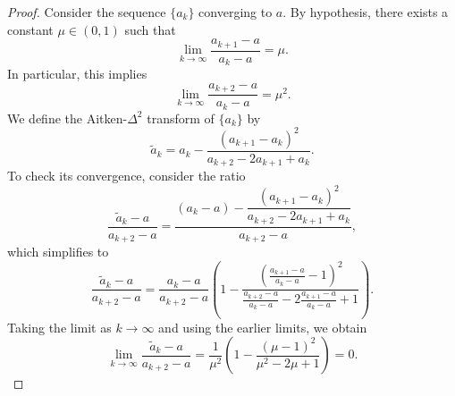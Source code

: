 \documentclass[10pt,a4paper]{amsart}
\begin{document}
\begin{proof}
	Consider the sequence \(\{a_k\}\) converging to \(a\). By hypothesis, there exists a constant \(\mu \in (0,1)\) such that
	\[
	\lim_{k \to \infty} \frac{a_{k+1} - a}{a_k - a} = \mu.
	\]
	In particular, this implies
	\[
	\lim_{k \to \infty} \frac{a_{k+2} - a}{a_k - a} = \mu^2.
	\]
	We define the Aitken-\(\Delta^2\) transform of \(\{a_k\}\) by
	\[
	\tilde{a}_k = a_k - \frac{(a_{k+1} - a_k)^2}{a_{k+2} - 2a_{k+1} + a_k}.
	\]
	To check its convergence, consider the ratio
	\[
	\frac{\tilde{a}_k - a}{a_{k+2} - a}
	= \frac{(a_k - a) - \dfrac{(a_{k+1} - a_k)^2}{a_{k+2} - 2a_{k+1} + a_k}}{a_{k+2} - a},
	\]
	which simplifies to
	\begin{equation}\label{eq:aitken_ratio}
		\frac{\tilde{a}_k - a}{a_{k+2} - a}
		= \frac{a_k - a}{a_{k+2} - a}
		\left(
		1 - \frac{\left( \tfrac{a_{k+1} - a}{a_k - a} - 1 \right)^2}{
			\tfrac{a_{k+2} - a}{a_k - a} - 2\tfrac{a_{k+1} - a}{a_k - a} + 1}
		\right).
	\end{equation}
	Taking the limit as \(k \to \infty\) and using the earlier limits, we obtain
	\[
	\lim_{k \to \infty} \frac{\tilde{a}_{k} - a}{a_{k+2} - a}
	= \frac{1}{\mu^2}
	\left(
	1 - \frac{(\mu - 1)^2}{\mu^2 - 2\mu + 1}
	\right)
	= 0.
	\]
\end{proof}%
\end{document}
